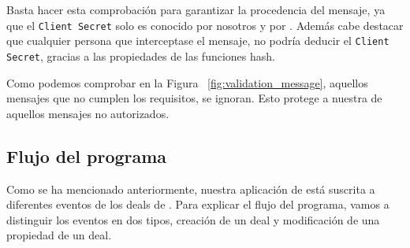 Basta hacer esta comprobación para garantizar la procedencia del mensaje, ya que el \verb|Client Secret| solo es conocido por nosotros y por \hs. 
Además cabe destacar que cualquier persona que interceptase el mensaje, no podría deducir el \verb|Client Secret|, gracias a las propiedades de las funciones hash. 




Como podemos comprobar en la Figura ~\ref{fig:validation_message}, aquellos mensajes que no cumplen los requisitos, se ignoran. Esto protege a nuestra \iface{} de aquellos mensajes no autorizados.




\subsection{Flujo del programa}

Como se ha mencionado anteriormente, nuestra aplicación de \hs{} está suscrita a diferentes eventos de los deals de \hs.
Para explicar el flujo del programa, vamos a distinguir los eventos en dos tipos, creación de un deal y modificación de una propiedad de un deal.

